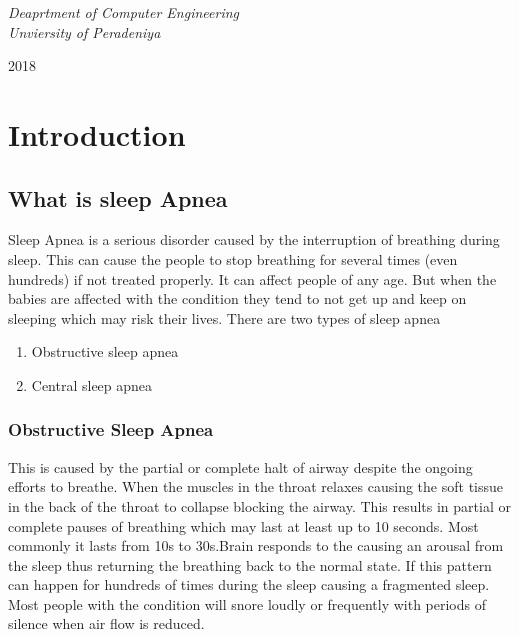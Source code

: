 \documentclass{report}
\begin{document}
\begin{titlepage}
	\vspace{0.5\baselineskip} %
	
	\textit{Deaprtment of Computer Engineering \\ Unviersity of Peradeniya} %
	
	\vfill %
	
	
	
	\vspace{0.3\baselineskip} %
	
	2018 %
	
\end{titlepage}


\clearpage


\tableofcontents
\clearpage

\listoffigures
\listoftables
\clearpage


\chapter{Introduction}


\section{What is sleep Apnea}

Sleep Apnea is a serious disorder caused by the interruption of breathing during sleep. This can cause the people to stop breathing for several times (even hundreds) if not treated properly. It can affect people of any age. But when the babies are affected with the condition they tend to not get up and keep on sleeping which may risk their lives. There are two types of sleep apnea 

\begin{enumerate}
    \item Obstructive sleep apnea
    \item Central sleep apnea
\end{enumerate}
    

\subsection{Obstructive Sleep Apnea}

    This is caused by the partial or complete halt of airway  despite the ongoing efforts to breathe. When the muscles in the throat relaxes causing the soft tissue in the back of the throat to collapse blocking the airway. This results in partial or complete pauses of breathing which may last at least up to 10 seconds. Most commonly  it lasts from 10s to 30s.Brain responds to the causing an arousal from the sleep thus returning the breathing back to the normal state. If this pattern can happen for hundreds of times during the sleep causing a fragmented sleep. Most people with the condition will snore loudly or frequently with periods of silence when air flow is reduced.\\ 
    
\end{document}
